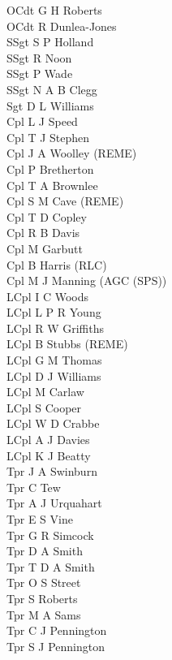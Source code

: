 \begin{multicols}{3}
  \small
  \noindent
  OCdt G H Roberts \\
  OCdt R Dunlea-Jones \\
  SSgt S P Holland \\
  SSgt R Noon \\
  SSgt P Wade \\
  SSgt N A B Clegg \\
  Sgt D L Williams \\
  Cpl L J Speed \\
  Cpl T J Stephen \\
  Cpl J A Woolley (REME) \\
  Cpl P Bretherton \\
  Cpl T A Brownlee \\
  Cpl S M Cave (REME) \\
  Cpl T D Copley \\
  Cpl R B Davis \\
  Cpl M Garbutt \\
  Cpl B Harris (RLC) \\
  Cpl M J Manning (AGC (SPS)) \\
  LCpl I C Woods \\
  LCpl L P R Young \\
  LCpl R W Griffiths \\
  LCpl B Stubbs (REME) \\
  LCpl G M Thomas \\
  LCpl D J Williams \\
  LCpl M Carlaw \\
  LCpl S Cooper \\
  LCpl W D Crabbe \\
  LCpl A J Davies \\
  LCpl K J Beatty \\
  Tpr J A Swinburn \\
  Tpr C Tew \\
  Tpr A J Urquahart \\
  Tpr E S Vine \\
  Tpr G R Simcock \\
  Tpr D A Smith \\
  Tpr T D A Smith \\
  Tpr O S Street \\
  Tpr S Roberts \\
  Tpr M A Sams \\
  Tpr C J Pennington \\
  Tpr S J Pennington \\

\end{multicols}
